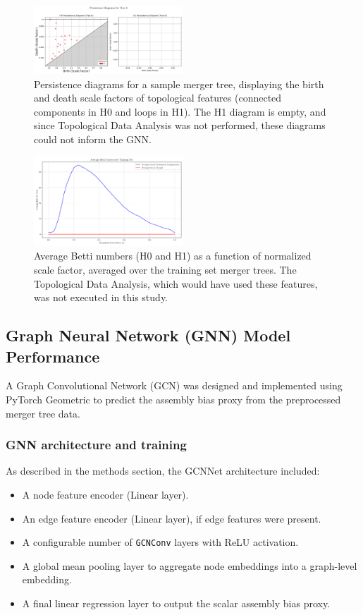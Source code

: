 \documentclass[twocolumn]{aastex631}
\begin{document}
\begin{figure}[htbp]
    \centering
    \includegraphics[width=0.5\textwidth]{../input_files/plots/persistence_diagram_tree0_20250524214205.png}
    \caption{\label{fig:persistence_diagram_h0_h1}Persistence diagrams for a sample merger tree, displaying the birth and death scale factors of topological features (connected components in H0 and loops in H1). The H1 diagram is empty, and since Topological Data Analysis was not performed, these diagrams could not inform the GNN.}
\end{figure}

\begin{figure}[htbp]
    \centering
    \includegraphics[width=0.5\textwidth]{../input_files/plots/avg_betti_curves_2_1748137556.png}
    \caption{\label{fig:avg_betti_numbers}Average Betti numbers (H0 and H1) as a function of normalized scale factor, averaged over the training set merger trees. The Topological Data Analysis, which would have used these features, was not executed in this study.}
\end{figure}

\subsection{Graph Neural Network (GNN) Model Performance}

A Graph Convolutional Network (GCN) was designed and implemented using PyTorch Geometric to predict the assembly bias proxy from the preprocessed merger tree data.

\subsubsection{GNN architecture and training}
As described in the methods section, the GCNNet architecture included:
\begin{itemize}
    \item A node feature encoder (Linear layer).
    \item An edge feature encoder (Linear layer), if edge features were present.
    \item A configurable number of \texttt{GCNConv} layers with ReLU activation.
    \item A global mean pooling layer to aggregate node embeddings into a graph-level embedding.
    \item A final linear regression layer to output the scalar assembly bias proxy.
\end{itemize}
\end{document}
